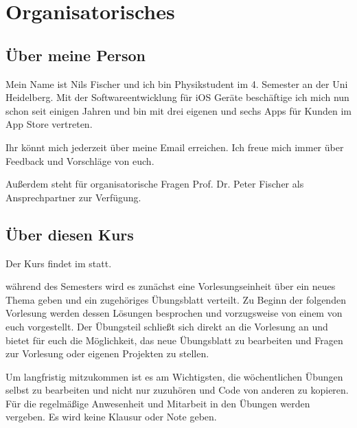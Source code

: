 \documentclass[parskip=half, final]{scrreprt}
\begin{document}
\maketitle

\tableofcontents

\chapter{Organisatorisches}

\section{Über meine Person}

Mein Name ist Nils Fischer und ich bin Physikstudent im 4. Semester an der Uni Heidelberg. Mit der Softwareentwicklung für iOS Geräte beschäftige ich mich nun schon seit einigen Jahren und bin mit drei eigenen und sechs Apps für Kunden im App Store vertreten.

Ihr könnt mich jederzeit über meine Email  erreichen. Ich freue mich immer über Feedback und Vorschläge von euch.

Außerdem steht für organisatorische Fragen Prof. Dr. Peter Fischer  als Ansprechpartner zur Verfügung.

\section{Über diesen Kurs}

Der Kurs findet im  statt.

 während des Semesters wird es zunächst eine Vorlesungseinheit über ein neues Thema geben und ein zugehöriges Übungsblatt verteilt. Zu Beginn der folgenden Vorlesung werden dessen Lösungen besprochen und vorzugsweise von einem von euch vorgestellt. Der Übungsteil schließt sich direkt an die Vorlesung an und bietet für euch die Möglichkeit, das neue Übungsblatt zu bearbeiten und Fragen zur Vorlesung oder eigenen Projekten zu stellen.

Um langfristig mitzukommen ist es am Wichtigsten, die wöchentlichen Übungen selbst zu bearbeiten und nicht nur zuzuhören und Code von anderen zu kopieren. Für die regelmäßige Anwesenheit und Mitarbeit in den Übungen werden  vergeben. Es wird keine Klausur oder Note geben.
\end{document}
